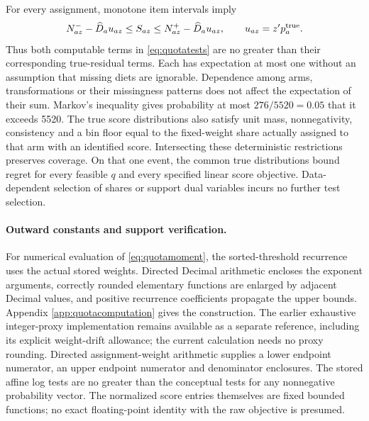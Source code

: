 \documentclass[11pt]{article}
\begin{document}
For every assignment, monotone item intervals imply
\[
 N_{az}^--\widehat D_a u_{az}\leq S_{az}\leq N_{az}^+-\widehat D_a u_{az},\qquad u_{az}=z'p_a^{\rm true}.
\]
Thus both computable terms in \eqref{eq:quotatests} are no greater than their corresponding true-residual terms. Each has expectation at most one without an assumption that missing diets are ignorable. Dependence among arms, transformations or their missingness patterns does not affect the expectation of their sum. Markov's inequality gives probability at most $276/5520=0.05$ that it exceeds 5520. The true score distributions also satisfy unit mass, nonnegativity, consistency and a bin floor equal to the fixed-weight share actually assigned to that arm with an identified score. Intersecting these deterministic restrictions preserves coverage. On that one event, the common true distributions bound regret for every feasible $q$ and every specified linear score objective. Data-dependent selection of shares or support dual variables incurs no further test selection.

\paragraph{Outward constants and support verification.}
For numerical evaluation of \eqref{eq:quotamoment}, the sorted-threshold recurrence uses the actual stored weights. Directed Decimal arithmetic encloses the exponent arguments, correctly rounded elementary functions are enlarged by adjacent Decimal values, and positive recurrence coefficients propagate the upper bounds. Appendix \ref{app:quotacomputation} gives the construction. The earlier exhaustive integer-proxy implementation remains available as a separate reference, including its explicit weight-drift allowance; the current calculation needs no proxy rounding. Directed assignment-weight arithmetic supplies a lower endpoint numerator, an upper endpoint numerator and denominator enclosures. The stored affine log tests are no greater than the conceptual tests for any nonnegative probability vector. The normalized score entries themselves are fixed bounded functions; no exact floating-point identity with the raw objective is presumed.
\end{document}

